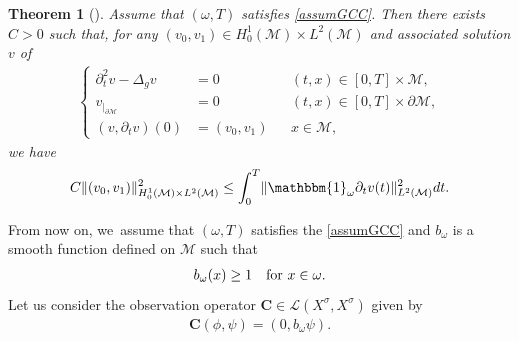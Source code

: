 \documentclass[JEP,XML,SOM,Unicode,published]{cedram}
\newtheorem{theorem}{Theorem}[section]
\theoremstyle{definition}
\let\mc\mathcal
\newcommand{\M}{\mc{M}}
\newcommand{\bC}{\boldsymbol{C}}
\providecommand{\norm}[1]{\lVert#1\rVert}
\begin{document}
\begin{theorem}[\cite{BLR:88}]\label{thm:blr-wave}
Assume that $(\omega, T)$ satisfies \ref{assumGCC}. Then there exists $C>0$ such that, for any $(v_0, v_1)\in H_0^1(\M)\times L^2(\M)$ and associated solution $v$ of
\begin{align}\label{eq:linear-waves}
\left\{\begin{aligned}
\partial_t^2 v-\Delta_g v&=0 &&(t, x)\in [0, T]\times\M,\\
v_{|_{\partial\M}}&=0 &&(t, x)\in [0, T]\times\partial\M,\\
(v, \partial_t v)(0)&=(v_0, v_1) &&x\in \M,
\end{aligned}\right.
\end{align}
we have
\begin{align}\label{thm:ineq:linear-waves-obs}
C\norm{(v_0, v_1)}_{H_0^1(\M)\times L^2(\M)}^2\leq \int_0^T \norm{\mathbbm{1}_\omega\partial_t v(t)}_{L^2(\M)}^2 dt.
\end{align}
\end{theorem}
From now on, we~assume that $(\omega, T)$ satisfies the \ref{assumGCC} and $b_\omega$ is a smooth function defined on $\M$ such that
\begin{align}
\label{lowerb}
b_{\omega}(x)\geq 1 \quad\textnormal{for }x\in \omega.
\end{align}
Let us consider the observation operator $\bC\in \mc{L}(X^\sigma, X^\sigma)$ given by
\begin{align}\label{eq:observation-operator-wave}
\bC(\phi, \psi)=(0, b_\omega\psi).
\end{align}
\end{document}
